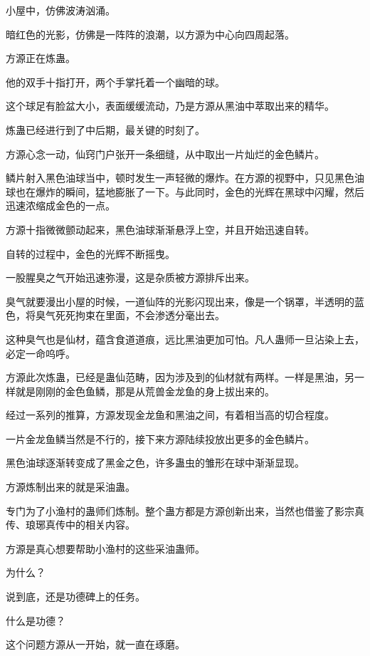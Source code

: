 
\begin{this_body}

小屋中，仿佛波涛汹涌。

暗红色的光影，仿佛是一阵阵的浪潮，以方源为中心向四周起落。

方源正在炼蛊。

他的双手十指打开，两个手掌托着一个幽暗的球。

这个球足有脸盆大小，表面缓缓流动，乃是方源从黑油中萃取出来的精华。

炼蛊已经进行到了中后期，最关键的时刻了。

方源心念一动，仙窍门户张开一条细缝，从中取出一片灿烂的金色鳞片。

鳞片射入黑色油球当中，顿时发生一声轻微的爆炸。在方源的视野中，只见黑色油球也在爆炸的瞬间，猛地膨胀了一下。与此同时，金色的光辉在黑球中闪耀，然后迅速浓缩成金色的一点。

方源十指微微颤动起来，黑色油球渐渐悬浮上空，并且开始迅速自转。

自转的过程中，金色的光辉不断摇曳。

一股腥臭之气开始迅速弥漫，这是杂质被方源排斥出来。

臭气就要漫出小屋的时候，一道仙阵的光影闪现出来，像是一个锅罩，半透明的蓝色，将臭气死死拘束在里面，不会渗透分毫出去。

这种臭气也是仙材，蕴含食道道痕，远比黑油更加可怕。凡人蛊师一旦沾染上去，必定一命呜呼。

方源此次炼蛊，已经是蛊仙范畴，因为涉及到的仙材就有两样。一样是黑油，另一样就是刚刚的金色鱼鳞，那是从荒兽金龙鱼的身上拔出来的。

经过一系列的推算，方源发现金龙鱼和黑油之间，有着相当高的切合程度。

一片金龙鱼鳞当然是不行的，接下来方源陆续投放出更多的金色鳞片。

黑色油球逐渐转变成了黑金之色，许多蛊虫的雏形在球中渐渐显现。

方源炼制出来的就是采油蛊。

专门为了小渔村的蛊师们炼制。整个蛊方都是方源创新出来，当然也借鉴了影宗真传、琅琊真传中的相关内容。

方源是真心想要帮助小渔村的这些采油蛊师。

为什么？

说到底，还是功德碑上的任务。

什么是功德？

这个问题方源从一开始，就一直在琢磨。


\end{this_body}
